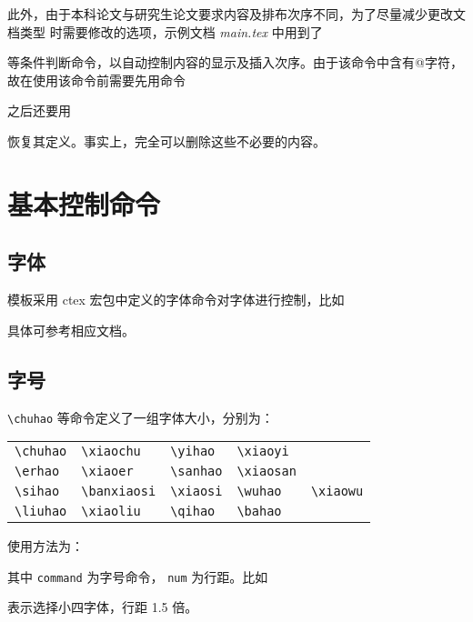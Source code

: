 此外，由于本科论文与研究生论文要求内容及排布次序不同，为了尽量减少更改文档类型
时需要修改的选项，示例文档 \emph{main.tex} 中用到了 
\begin{latex}
\ifzzu@bachelor
\end{latex}
等条件判断命令，以自动控制内容的显示及插入次序。由于该命令中含有@字符，
故在使用该命令前需要先用命令
\begin{latex}
\makeatletter
\end{latex}
之后还要用
\begin{latex}
\makeatother
\end{latex}
恢复其定义。事实上，完全可以删除这些不必要的内容。

\section{基本控制命令}

\subsection*{字体}

模板采用 ctex 宏包中定义的字体命令对字体进行控制，比如
\begin{latex}
\songti     %
\fangsong   %
\kaishu     %
\heiti      %
\end{latex}
具体可参考相应文档。

\subsection*{字号}

\verb|\chuhao| 等命令定义了一组字体大小，分别为：

\begin{center}
\begin{tabular}{lllll}
\hline
\verb|\chuhao|&\verb|\xiaochu|&\verb|\yihao|&\verb|\xiaoyi|&\\
\verb|\erhao|&\verb|\xiaoer|&\verb|\sanhao|&\verb|\xiaosan|&\\
\verb|\sihao|&\verb|\banxiaosi|&\verb|\xiaosi|&\verb|\wuhao|&\verb|\xiaowu|\\
\verb|\liuhao|&\verb|\xiaoliu|&\verb|\qihao|&\verb|\bahao|&\\\hline
\end{tabular}
\end{center}

使用方法为：
\begin{latex}
\command[<num>]
\end{latex}
其中 \texttt{command} 为字号命令，
\texttt{num} 为行距。比如
\begin{latex}
\xiaosi[1.5]
\end{latex}
表示选择小四字体，行距 1.5 倍。

